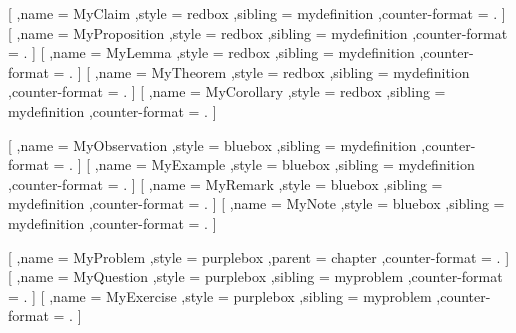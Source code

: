         [
            ,name = MyClaim
            ,style = redbox
            ,sibling = mydefinition
            ,counter-format = .
        ]
        [
            ,name = MyProposition
            ,style = redbox
            ,sibling = mydefinition
            ,counter-format = .
        ]
        [
            ,name = MyLemma
            ,style = redbox
            ,sibling = mydefinition
            ,counter-format = .
        ]
        [
            ,name = MyTheorem
            ,style = redbox
            ,sibling = mydefinition
            ,counter-format = .
        ]
        [
            ,name = MyCorollary
            ,style = redbox
            ,sibling = mydefinition
            ,counter-format = .
        ]

        [
            ,name = MyObservation
            ,style = bluebox
            ,sibling = mydefinition
            ,counter-format = .
        ]
        [
            ,name = MyExample
            ,style = bluebox
            ,sibling = mydefinition
            ,counter-format = .
        ]
        [
            ,name = MyRemark
            ,style = bluebox
            ,sibling = mydefinition
            ,counter-format = .
        ]
        [
            ,name = MyNote
            ,style = bluebox
            ,sibling = mydefinition
            ,counter-format = .
        ]

        [
            ,name = MyProblem
            ,style = purplebox
            ,parent = chapter
            ,counter-format = .
        ]
        [
            ,name = MyQuestion
            ,style = purplebox
            ,sibling = myproblem
            ,counter-format = .
        ]
        [
            ,name = MyExercise
            ,style = purplebox
            ,sibling = myproblem
            ,counter-format = .
        ]
